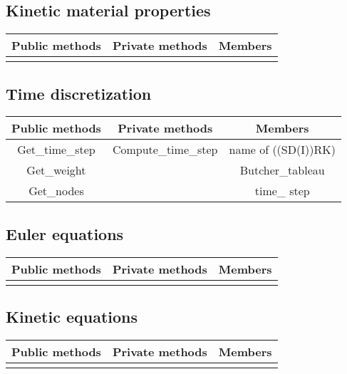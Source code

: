 \subsection{Kinetic material properties}
\begin{table}[H]
  \centering
  \begin{tabular}{|c|c|c|}
    \hline
    Public methods & Private methods & Members \\
    \hline
     & & \\
    \hline
  \end{tabular}
\end{table}

\subsection{Time discretization}
\begin{table}[H]
  \centering
  \begin{tabular}{|c|c|c|}
    \hline
    Public methods & Private methods & Members \\
    \hline
    Get\_time\_step & Compute\_time\_step & name of ((SD(I))RK) \\
    Get\_weight     &                     & Butcher\_tableau    \\
    Get\_nodes      &                     & time\_ step         \\
    \hline
  \end{tabular}
\end{table}  

\subsection{Euler equations}
\begin{table}[H]
  \centering
  \begin{tabular}{|c|c|c|}
    \hline
    Public methods & Private methods & Members \\
    \hline
     & & \\
    \hline
  \end{tabular}
\end{table}

\subsection{Kinetic equations}
\begin{table}[H]
  \centering
  \begin{tabular}{|c|c|c|}
    \hline
    Public methods & Private methods & Members \\
    \hline
     & & \\
    \hline
  \end{tabular}
\end{table}

